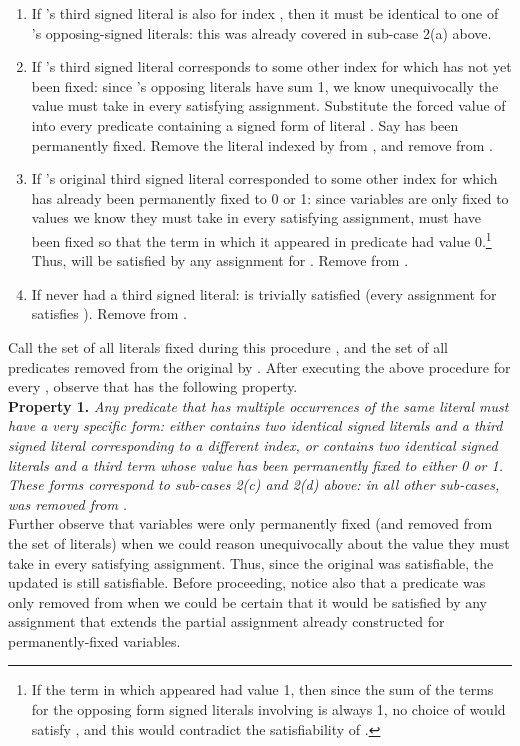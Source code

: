 \documentclass{article}
\begin{document}
\begin{enumerate}
\begin{enumerate}
\item If 's third signed literal is also for index , then it must be identical to one of 's opposing-signed literals: this was already covered in sub-case 2(a) above.
\item  If 's third signed literal corresponds to some other index  for which  has not yet been fixed: since 's opposing literals have sum 1, we know unequivocally the value  must take in every satisfying assignment. Substitute the forced value of  into every predicate containing a signed form of literal . Say  has been permanently fixed. 
 Remove the literal indexed by  from , and remove  from . 
\item If 's original third signed literal corresponded to some other index  for which  has already been permanently fixed to 0 or 1: since variables are only fixed to values we know they must take in every satisfying assignment,  must have been fixed so that the term in which it appeared in predicate  had value 0.\footnote{If the term in which  appeared had value 1, then since the sum of the terms for the opposing form signed literals involving  is always 1, no choice of  would satisfy , and this would contradict the satisfiability of . } Thus,  will be satisfied by any assignment for . Remove  from .

\item If  never had a third signed literal:   is trivially satisfied (every assignment for  satisfies ). Remove  from .


\end{enumerate}
\end{enumerate}

Call the set of all literals fixed during this procedure , and the set of all predicates removed from the original  by .
After executing the above procedure for every , observe that  has the following property.  \\

\noindent \textbf{Property 1.} \textit{Any predicate  that has multiple occurrences of the same literal must have a very specific form: either  contains two identical signed literals and a third signed literal corresponding to a different index, or   contains two identical signed literals and a third term whose value has been permanently fixed to either 0 or 1. These forms correspond to sub-cases 2(c) and 2(d) above: in all other sub-cases,  was removed from .}\\

Further observe that variables were only permanently fixed (and removed from the set of literals) when we could reason unequivocally about the value they must take in every satisfying assignment. Thus, since the original  was satisfiable, the updated  is still satisfiable. Before proceeding, notice also that a predicate was only removed from  when we could be certain that it would be satisfied by any assignment that extends the partial assignment already constructed for permanently-fixed variables.
\end{document}
